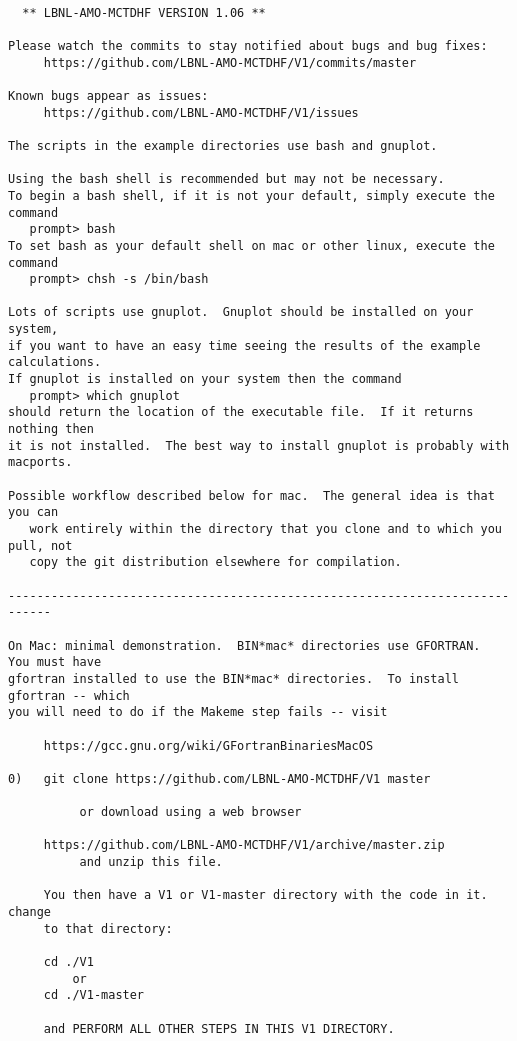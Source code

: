 \begin{verbatim}

  ** LBNL-AMO-MCTDHF VERSION 1.06 **

Please watch the commits to stay notified about bugs and bug fixes:
     https://github.com/LBNL-AMO-MCTDHF/V1/commits/master

Known bugs appear as issues:
     https://github.com/LBNL-AMO-MCTDHF/V1/issues

The scripts in the example directories use bash and gnuplot.  

Using the bash shell is recommended but may not be necessary.
To begin a bash shell, if it is not your default, simply execute the command
   prompt> bash
To set bash as your default shell on mac or other linux, execute the command
   prompt> chsh -s /bin/bash

Lots of scripts use gnuplot.  Gnuplot should be installed on your system,
if you want to have an easy time seeing the results of the example calculations.
If gnuplot is installed on your system then the command
   prompt> which gnuplot
should return the location of the executable file.  If it returns nothing then
it is not installed.  The best way to install gnuplot is probably with macports.

Possible workflow described below for mac.  The general idea is that you can 
   work entirely within the directory that you clone and to which you pull, not 
   copy the git distribution elsewhere for compilation.

----------------------------------------------------------------------------

On Mac: minimal demonstration.  BIN*mac* directories use GFORTRAN.  You must have
gfortran installed to use the BIN*mac* directories.  To install gfortran -- which
you will need to do if the Makeme step fails -- visit 

     https://gcc.gnu.org/wiki/GFortranBinariesMacOS

0)   git clone https://github.com/LBNL-AMO-MCTDHF/V1 master

          or download using a web browser

     https://github.com/LBNL-AMO-MCTDHF/V1/archive/master.zip
          and unzip this file.

     You then have a V1 or V1-master directory with the code in it.  change
     to that directory:

     cd ./V1
         or
     cd ./V1-master

     and PERFORM ALL OTHER STEPS IN THIS V1 DIRECTORY.


\end{verbatim}
